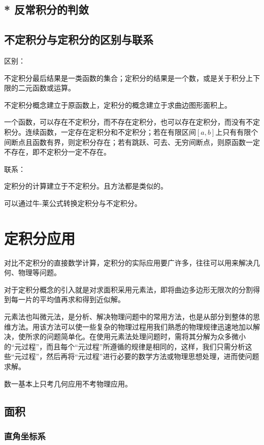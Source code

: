 \documentclass[UTF8, 12pt]{ctexart}
\begin{document}
\subsection{* 反常积分的判敛}

\subsection{不定积分与定积分的区别与联系}

区别：

不定积分最后结果是一类函数的集合；定积分的结果是一个数，或是关于积分上下限的二元函数或运算。

不定积分概念建立于原函数上，定积分的概念建立于求曲边图形面积上。

一个函数，可以存在不定积分，而不存在定积分，也可以存在定积分，而没有不定积分。连续函数，一定存在定积分和不定积分；若在有限区间$[a,b]$上只有有限个间断点且函数有界，则定积分存在；若有跳跃、可去、无穷间断点，则原函数一定不存在，即不定积分一定不存在。

联系：

定积分的计算建立于不定积分。且方法都是类似的。

可以通过牛-莱公式转换定积分与不定积分。

\section{定积分应用}

对比不定积分的直接数学计算，定积分的实际应用要广许多，往往可以用来解决几何、物理等问题。

对于定积分概念的引入就是对求面积采用元素法，即将曲边多边形无限次的分割得到每一片的平均值再求和得到近似解。

元素法也叫微元法，是分析、解决物理问题中的常用方法，也是从部分到整体的思维方法。用该方法可以使一些复杂的物理过程用我们熟悉的物理规律迅速地加以解决，使所求的问题简单化。在使用元素法处理问题时，需将其分解为众多微小的“元过程”，而且每个“元过程”所遵循的规律是相同的，这样，我们只需分析这些“元过程”，然后再将“元过程”进行必要的数学方法或物理思想处理，进而使问题求解。

数一基本上只考几何应用不考物理应用。

\subsection{面积}

\subsubsection{直角坐标系}
\end{document}
